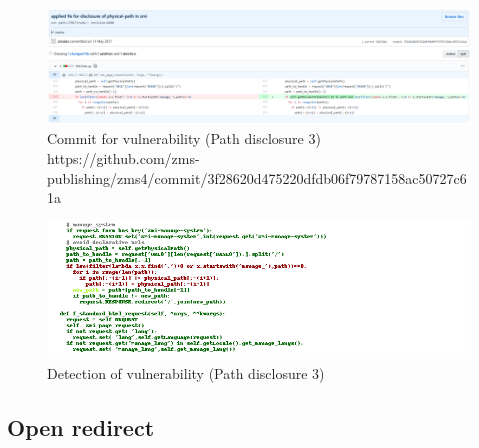 \documentclass[
a4paper,
pagesize,
pdftex,
12pt,
twoside, %
BCOR=5mm, %
ngerman,
fleqn,
final,
]{scrartcl}
\begin{document}
	
	\begin{figure}[H]
		\centering
		\includegraphics[width=\linewidth]{Images/path_disclosureB}
		\caption{Commit for vulnerability (Path disclosure 3) \newline \scriptsize{
				https://github.com/zms-publishing/zms4/commit/3f28620d475220dfdb06f79787158ac50727c61a}}
		\label{fig:path_disclosureC}
	\end{figure}
	\begin{figure}[H]
		\centering
		\includegraphics[width=\linewidth]{Images/path_disclosureBr}
		\caption{Detection of vulnerability (Path disclosure 3)}
		\label{fig:path_disclosureCr}
	\end{figure}
	
	
	
	
	
	
	\subsection{Open redirect}

	
	
\end{document}
